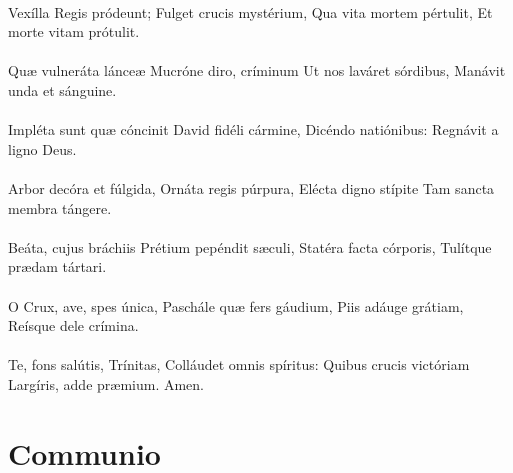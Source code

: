 \documentclass[12pt, a4paper]{article}
\begin{document}
	\\
	Vexílla Regis pródeunt;
	Fulget crucis mystérium,
	Qua vita mortem pértulit,
	Et morte vitam prótulit.
	\\\\
	Quæ vulneráta lánceæ
	Mucróne diro, críminum
	Ut nos laváret sórdibus,
	Manávit unda et sánguine.
	\\\\
	Impléta sunt quæ cóncinit
	David fidéli cármine,
	Dicéndo natiónibus:
	Regnávit a ligno Deus.
	\\\\
	Arbor decóra et fúlgida,
	Ornáta regis púrpura,
	Elécta digno stípite
	Tam sancta membra tángere.
	\\\\
	Beáta, cujus bráchiis
	Prétium pepéndit sæculi,
	Statéra facta córporis,
	Tulítque prædam tártari.
	\\\\
	O Crux, ave, spes única,
	Paschále quæ fers gáudium,
	Piis adáuge grátiam,
	Reísque dele crímina.
	\\\\
	Te, fons salútis, Trínitas,
	Colláudet omnis spíritus:
	Quibus crucis victóriam
	Largíris, adde præmium.
	Amen.
	
	\section*{Communio}
	
\end{document}
